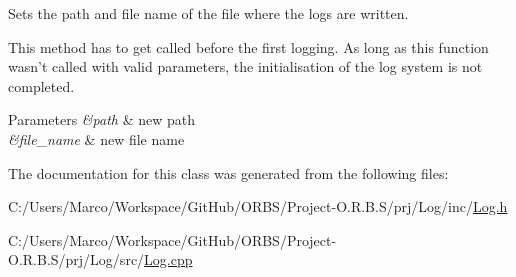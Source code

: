 Sets the path and file name of the file where the logs are written. 

This method has to get called before the first logging. As long as this function wasn't called with valid parameters, the initialisation of the log system is not completed. 
\begin{DoxyParams}{Parameters}
{\em \&path} & new path \\
\hline
{\em \&file\-\_\-name} & new file name \\
\hline
\end{DoxyParams}


The documentation for this class was generated from the following files\-:\begin{DoxyCompactItemize}
\item 
C\-:/\-Users/\-Marco/\-Workspace/\-Git\-Hub/\-O\-R\-B\-S/\-Project-\/\-O.\-R.\-B.\-S/prj/\-Log/inc/\hyperlink{_log_8h}{Log.\-h}\item 
C\-:/\-Users/\-Marco/\-Workspace/\-Git\-Hub/\-O\-R\-B\-S/\-Project-\/\-O.\-R.\-B.\-S/prj/\-Log/src/\hyperlink{_log_8cpp}{Log.\-cpp}\end{DoxyCompactItemize}
